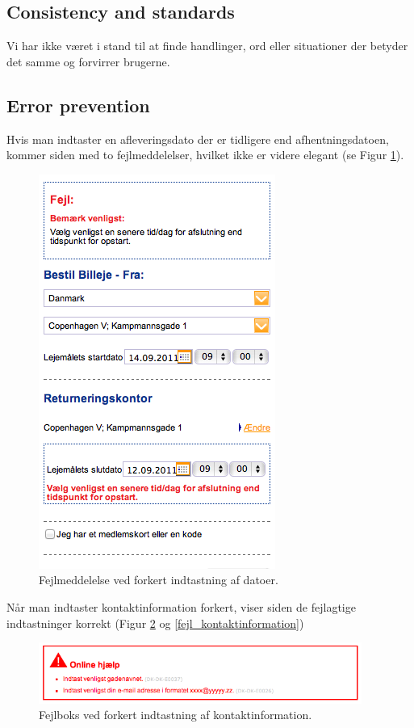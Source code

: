 \documentclass[a4paper]{article}
\begin{document}
\subsection{Consistency and standards}
Vi har ikke været i stand til at finde handlinger, ord eller situationer der
betyder det samme og forvirrer brugerne.

\subsection{Error prevention}
Hvis man indtaster en afleveringsdato der er tidligere end afhentningsdatoen,
kommer siden med to fejlmeddelelser, hvilket ikke er videre elegant (se Figur
\ref{fejl_datoer}).

\begin{figure}[]
  \begin{center}
    \includegraphics{6.png}
  \end{center}
  \caption{Fejlmeddelelse ved forkert indtastning af datoer.}
  \label{fejl_datoer}
\end{figure}

Når man indtaster kontaktinformation forkert, viser siden de fejlagtige
indtastninger korrekt (Figur \ref{fejl_boks} og \ref{fejl_kontaktinformation})

\begin{figure}[]
  \begin{center}
    \includegraphics[width=400px]{7.png}
  \end{center}
  \caption{Fejlboks ved forkert indtastning af kontaktinformation.}
  \label{fejl_boks}
\end{figure}
\end{document}
